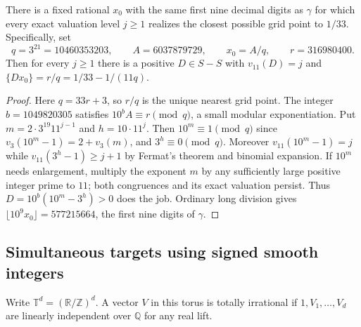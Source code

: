 \documentclass[11pt,a4paper]{article}
\theoremstyle{definition}\newtheorem{definition}[theorem]{Definition}\newtheorem{example}[theorem]{Example}
\theoremstyle{remark}\newtheorem{remark}[theorem]{Remark}
\newcommand{\Q}{\mathbb Q}\newcommand{\Z}{\mathbb Z}\newcommand{\R}{\mathbb R}\newcommand{\N}{\mathbb N}
\begin{document}
\begin{proposition}\label{prop:rational-surrogate}
There is a fixed rational $x_0$ with the same first nine decimal digits as
$\gamma$ for which every exact valuation level $j\ge1$ realizes the closest
possible grid point to $1/33$. Specifically, set
\[
 q=3^{21}=10460353203,\qquad A=6037879729,\qquad
 x_0=A/q,\qquad r=316980400.
\]
Then for every $j\ge1$ there is a positive $D\in S-S$ with $v_{11}(D)=j$ and
$\{Dx_0\}=r/q=1/33-1/(11q)$.
\end{proposition}
\begin{proof}
Here $q=33r+3$, so $r/q$ is the unique nearest grid point. The integer
$b=1049820305$ satisfies $10^bA\equiv r\pmod q$, a small modular
exponentiation. Put $m=2\cdot3^{19}11^{j-1}$ and $h=10\cdot11^j$.
Then $10^m\equiv1\pmod q$ since $v_3(10^m-1)=2+v_3(m)$, and
$3^h\equiv0\pmod q$. Moreover $v_{11}(10^m-1)=j$ while
$v_{11}(3^h-1)\ge j+1$ by Fermat's theorem and binomial expansion.
If $10^m$ needs enlargement, multiply the exponent $m$ by any sufficiently
large positive integer prime to $11$; both congruences and its exact valuation
persist. Thus $D=10^b(10^m-3^h)>0$ does the job. Ordinary long division gives
$\lfloor10^9 x_0\rfloor=577215664$, the first nine digits of $\gamma$.
\end{proof}

\subsection{Simultaneous targets using signed smooth integers}
Write $\mathbb T^d=(\R/\Z)^d$. A vector $V$ in this torus is totally irrational
if $1,V_1,\ldots,V_d$ are linearly independent over $\Q$ for any real lift.
\end{document}

